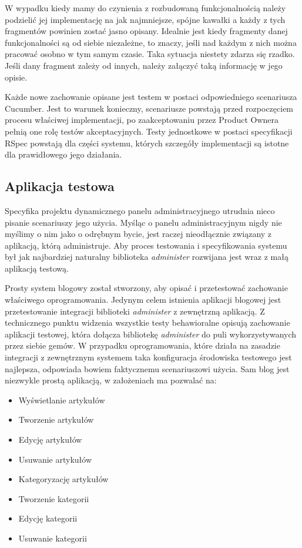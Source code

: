   W wypadku kiedy mamy do czynienia z rozbudowaną funkcjonalnością należy podzielić jej implementację na jak najmniejsze, spójne kawałki a każdy z tych fragmentów powinien zostać jasno opisany. Idealnie jest kiedy fragmenty danej funkcjonalności są od siebie niezależne, to znaczy, jeśli nad każdym z nich można pracować osobno w tym samym czasie. Taka sytuacja niestety zdarza się rzadko. Jeśli dany fragment zależy od innych, należy załączyć taką informację w jego opisie.
  
  Każde nowe zachowanie opisane jest testem w postaci odpowiedniego scenariusza Cucumber. Jest to warunek konieczny, scenariusze powstają przed rozpoczęciem procesu właściwej implementacji, po zaakceptowaniu przez Product Ownera pełnią one rolę testów akceptacyjnych. Testy jednostkowe w postaci specyfikacji RSpec powstają dla części systemu, których szczegóły implementacji są istotne dla prawidłowego jego działania.
  
  \subsection{Aplikacja testowa}
  Specyfika projektu dynamicznego panelu administracyjnego utrudnia nieco pisanie scenariuszy jego użycia. Myśląc o panelu administracyjnym nigdy nie myślimy o nim jako o odrębnym bycie, jest raczej nieodłącznie związany z aplikacją, którą administruje. Aby proces testowania i specyfikowania systemu był jak najbardziej naturalny biblioteka \emph{administer} rozwijana jest wraz z małą aplikacją testową.
  
  Prosty system blogowy został stworzony, aby opisać i przetestować zachowanie właściwego oprogramowania. Jedynym celem istnienia aplikacji blogowej jest przetestowanie integracji biblioteki \emph{administer} z zewnętrzną aplikacją. Z technicznego punktu widzenia wszystkie testy behawioralne opisują zachowanie aplikacji testowej, która dołącza bibliotekę \emph{administer} do puli wykorzystywanych przez siebie gemów. W przypadku oprogramowania, które działa na zasadzie integracji z zewnętrznym systemem taka konfiguracja środowiska testowego jest najlepsza, odpowiada bowiem faktycznemu scenariuszowi użycia. Sam blog jest niezwykle prostą aplikacją, w założeniach ma pozwalać na:
  
  \begin{itemize}
    \item Wyświetlanie artykułów
    \item Tworzenie artykułów
    \item Edycję artykułów
    \item Usuwanie artykułów
    \item Kategoryzację artykułów
    \item Tworzenie kategorii
    \item Edycję kategorii
    \item Usuwanie kategorii
  \end{itemize}
  
